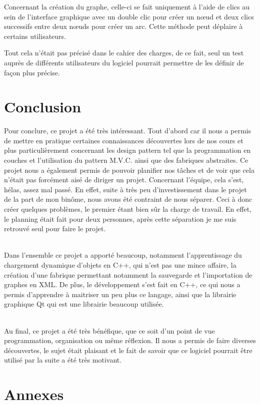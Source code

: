 \documentclass[11pt,a4paper]{article}
\begin{document}
		Concernant la création du graphe, celle-ci se fait uniquement à l'aide de clics au sein de l'interface graphique avec un double clic pour créer un n\oe ud et deux clics successifs entre deux n\oe uds pour créer un arc. Cette méthode peut déplaire à certains utilisateurs.
		
		 Tout cela n'était pas précisé dans le cahier des charges, de ce fait, seul un test auprès de différents utilisateurs du logiciel pourrait permettre de les définir de façon plus précise.
		
	\newpage
	\section{Conclusion}
		Pour conclure, ce projet a été très intéressant. Tout d'abord car il nous a permis de mettre en pratique certaines connaissances découvertes lors de nos cours et plus particulièrement concernant les design pattern tel que la programmation en couches et l'utilisation du pattern M.V.C. ainsi que des fabriques abstraites. Ce projet nous a également permis de pouvoir planifier nos tâches et de voir que cela n'était pas forcément aisé de diriger un projet. Concernant l'équipe, cela s'est, hélas, assez mal passé. En effet, suite à très peu d'investissement dans le projet de la part de mon binôme, nous avons été contraint de nous séparer. Ceci à donc créer quelques problèmes, le premier étant bien sûr la charge de travail. En effet, le planning était fait pour deux personnes, après cette séparation je me suis retrouvé seul pour faire le projet.
		
		~\\
		\indent Dans l'ensemble ce projet a apporté beaucoup, notamment l'apprentissage du chargement dynamique d'objets en C++, qui n'est pas une mince affaire, la création d'une fabrique permettant notamment la sauvegarde et l'importation de graphes en XML. De plus, le développement s'est fait en C++, ce qui nous a permis d'apprendre à maitriser un peu plus ce langage, ainsi que la librairie graphique Qt qui est une librairie beaucoup utilisée. 
		
		~\\
		\indent Au final, ce projet a été très bénéfique, que ce soit d'un point de vue programmation, organisation ou même réflexion. Il nous a permis de faire diverses découvertes, le sujet était plaisant et le fait de savoir que ce logiciel pourrait être utilisé par la suite a été très motivant.
	
	\newpage
	\section{Annexes}
\end{document}
